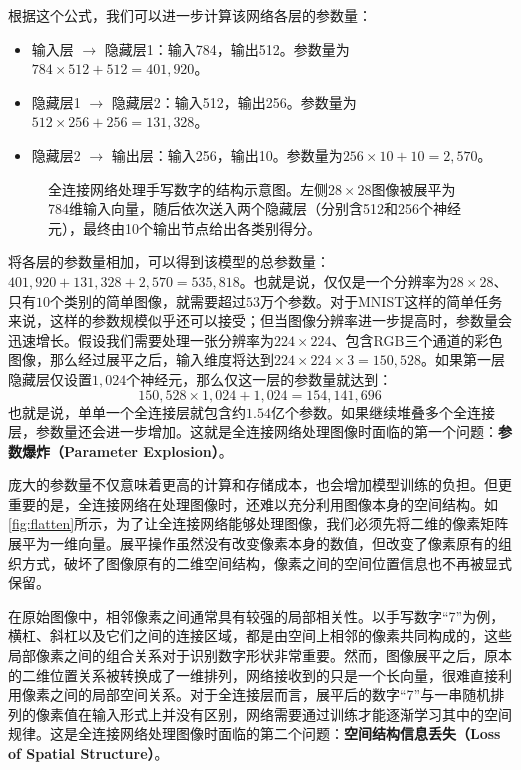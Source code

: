 根据这个公式，我们可以进一步计算该网络各层的参数量：
\begin{itemize}
    \item 输入层 $\to$ 隐藏层1：输入784，输出512。参数量为$784 \times 512 + 512 = 401,920$。
    \item 隐藏层1 $\to$ 隐藏层2：输入512，输出256。参数量为$512 \times 256 + 256 = 131,328$。
    \item 隐藏层2 $\to$ 输出层：输入256，输出10。参数量为$256 \times 10 + 10 = 2,570$。
\end{itemize}

\begin{figure}[H]
    \caption{全连接网络处理手写数字的结构示意图。左侧$28\times 28$图像被展平为784维输入向量，随后依次送入两个隐藏层（分别含512和256个神经元），最终由10个输出节点给出各类别得分。}
    \label{fig:fcn}
\end{figure}

将各层的参数量相加，可以得到该模型的总参数量：$401,920+131,328+2,570=535,818$。也就是说，仅仅是一个分辨率为$28\times28$、只有$10$个类别的简单图像，就需要超过$53$万个参数。对于MNIST这样的简单任务来说，这样的参数规模似乎还可以接受；但当图像分辨率进一步提高时，参数量会迅速增长。假设我们需要处理一张分辨率为$224\times224$、包含RGB三个通道的彩色图像，那么经过展平之后，输入维度将达到$224\times224\times3=150,528$。如果第一层隐藏层仅设置$1,024$个神经元，那么仅这一层的参数量就达到：
$$
150,528\times1,024+1,024=154,141,696
$$
也就是说，单单一个全连接层就包含约$1.54$亿个参数。如果继续堆叠多个全连接层，参数量还会进一步增加。这就是全连接网络处理图像时面临的第一个问题：\textbf{参数爆炸（Parameter Explosion）}。

庞大的参数量不仅意味着更高的计算和存储成本，也会增加模型训练的负担。但更重要的是，全连接网络在处理图像时，还难以充分利用图像本身的空间结构。如\cref{fig:flatten}所示，为了让全连接网络能够处理图像，我们必须先将二维的像素矩阵展平为一维向量。展平操作虽然没有改变像素本身的数值，但改变了像素原有的组织方式，破坏了图像原有的二维空间结构，像素之间的空间位置信息也不再被显式保留。

在原始图像中，相邻像素之间通常具有较强的局部相关性。以手写数字“7”为例，横杠、斜杠以及它们之间的连接区域，都是由空间上相邻的像素共同构成的，这些局部像素之间的组合关系对于识别数字形状非常重要。然而，图像展平之后，原本的二维位置关系被转换成了一维排列，网络接收到的只是一个长向量，很难直接利用像素之间的局部空间关系。对于全连接层而言，展平后的数字“7”与一串随机排列的像素值在输入形式上并没有区别，网络需要通过训练才能逐渐学习其中的空间规律。这是全连接网络处理图像时面临的第二个问题：\textbf{空间结构信息丢失（Loss of Spatial Structure）}。

